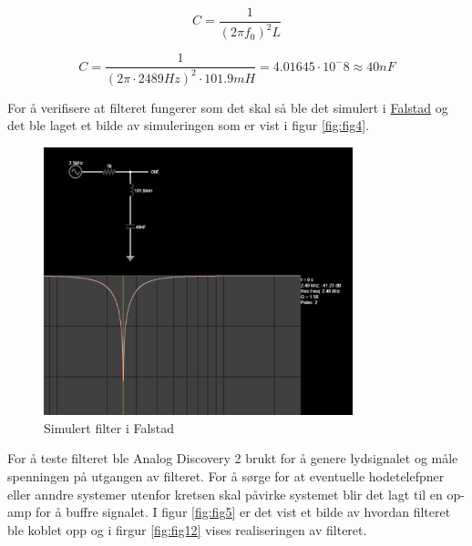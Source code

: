 \begin{equation}
	C = \frac{1}{(2\pi f_0)^2 L}
	\label{eq:2}
\end{equation}

\begin{equation}
	C = \frac{1}{(2\pi \cdot 2489Hz)^2 \cdot 101.9mH} = 4.01645 \cdot 10^-8 \approx 40nF
	\label{eq:3}
\end{equation}

For å verifisere at filteret fungerer som det skal så ble det simulert i \href{https://www.falstad.com/afilter/circuitjs.html?cct=$+1+0.000005+5+50+5+40%0A%25+0+28853.998118144256%0Al+912+208+912+304+0+0.1018+0%0Ac+912+304+912+400+0+4e-8+0%0Ar+800+208+912+208+0+1000%0AO+912+208+976+208+0%0Ag+912+400+912+432+0%0A170+800+208+768+208+3+20+60+5+0.5%0Ao+5+64+0+34+5+0.00009765625+0+-1+in%0Ao+3+64+0+34+5+0.00009765625+1+-1+out%0Ao+0+64+0+34+10+0.025+2+-1+inductor%0Ao+1+64+0+34+10+0.025+2+-1+cap%0A}{Falstad} og det ble laget et bilde av simuleringen som er vist i figur \autoref{fig:fig4}.

\begin{figure}[!h]
	\centering
	\includegraphics[width=0.8\textwidth]{Bilder/Falstad_filters.png}
	\caption{Simulert filter i Falstad}
	\label{fig:fig4}
\end{figure}


For å teste filteret ble Analog Discovery 2 brukt for å genere lydsignalet og måle spenningen på utgangen av filteret. For å sørge for at eventuelle hodetelefpner eller anndre systemer utenfor kretsen skal påvirke systemet blir det lagt til en op-amp for å buffre signalet. I figur \autoref{fig:fig5} er det vist et bilde av hvordan filteret ble koblet opp og i firgur \autoref{fig:fig12} vises realiseringen av filteret.

